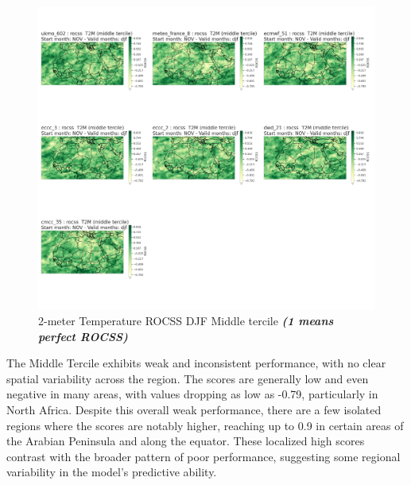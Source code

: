 \begin{figure}[H]
    \centering
    \includegraphics[width=1\linewidth]{plots/prob/rocss/rocss_djf_t2m_middle.png}
    \caption{2-meter Temperature ROCSS DJF Middle tercile \textbf{\textit{(1 means perfect ROCSS)}}}
\end{figure}

The Middle Tercile exhibits weak and inconsistent performance, with no clear spatial variability across the region. The scores are generally low and even negative in many areas, with values dropping as low as -0.79, particularly in North Africa. Despite this overall weak performance, there are a few isolated regions where the scores are notably higher, reaching up to 0.9 in certain areas of the Arabian Peninsula and along the equator. These localized high scores contrast with the broader pattern of poor performance, suggesting some regional variability in the model's predictive ability.
